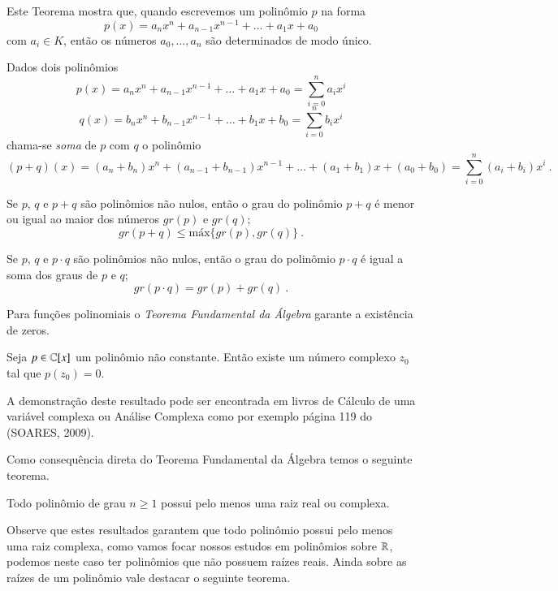   Este Teorema mostra que, quando escrevemos um polinômio $p$ na forma
 \[p(x)= a_nx^n + a_{n-1}x^{n-1}+ \ldots + a_1x+ a_0\]
 com $a_i \in K$, então os números $a_0, \ldots, a_n$ são determinados de modo único.

 Dados dois polinômios
 \[p(x)= a_nx^n + a_{n-1}x^{n-1}+ \ldots + a_1x+ a_0= \sum_{i=0}^{n} a_ix^i\]
  \[q(x)= b_nx^n + b_{n-1}x^{n-1}+ \ldots + b_1x+ b_0= \sum_{i=0}^{n} b_ix^i\]
  chama-se \emph{soma} de $p$ com $q$ o polinômio
  \[(p+q)(x)= (a_n+ b_n)x^n + (a_{n-1}+b_{n-1})x^{n-1}+ \ldots + (a_1+b_1)x+ (a_0+b_0)= \sum_{i=0}^{n} (a_i+b_i)x^i \ .\]

  \begin{teo}
  Se $p$, $q$ e $p+q$ são polinômios não nulos, então o grau do polinômio $p+q$ é menor ou igual ao maior dos números $gr(p)$ e $gr(q)$;
  \[gr(p+q) \leq \text{máx}\{gr(p), gr(q)\} \ .\]
  \end{teo}

  \begin{teo}
  Se $p$, $q$ e $p \cdot q$ são polinômios não nulos, então o grau do polinômio $p \cdot q$ é igual a soma dos graus de $p$ e $q$;
  \[gr(p \cdot q) = gr(p) + gr(q) \ .\]
  \end{teo}

  Para funções polinomiais o \emph{Teorema Fundamental da Álgebra} garante a existência de zeros.

  \begin{teo}
  Seja $p \in \mathbb{C}[x]$ um polinômio não constante. Então existe um número complexo $z_0$ tal que $p(z_0)=0$.
  \end{teo}

  \begin{dem}
  A demonstração deste resultado pode ser encontrada em livros de Cálculo de uma variável complexa ou Análise Complexa como por exemplo página 119 do (SOARES, 2009).
  \end{dem}

  Como consequência direta do Teorema Fundamental da Álgebra temos o seguinte teorema.

  \begin{teo}
  Todo polinômio de grau $n \geq 1$ possui pelo menos uma raiz real ou complexa.
  \end{teo}

 Observe que estes resultados garantem que todo polinômio possui pelo menos uma raiz complexa, como vamos focar nossos estudos em polinômios sobre $\mathbb{R}$, podemos neste caso ter polinômios que não possuem raízes reais. Ainda sobre as raízes de um polinômio vale destacar o seguinte teorema.

